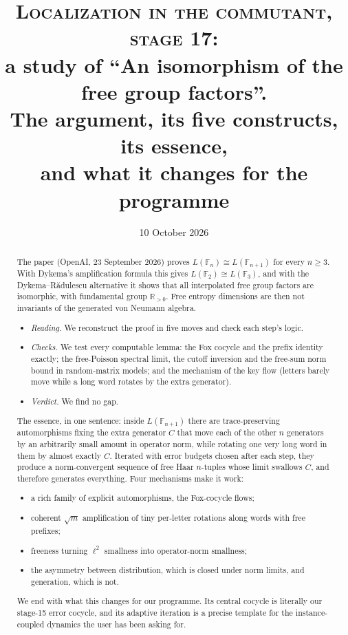\documentclass[11pt]{article}
\title{\textsc{Localization in the commutant, stage 17:}\\ \large a study of ``An isomorphism of the free group factors''.\\
The argument, its five constructs, its essence,\\ and what it changes for the programme}
\author{}
\date{10 October 2026}
\theoremstyle{plain}
\theoremstyle{definition}\newtheorem{definition}[theorem]{Definition}\newtheorem{remark}[theorem]{Remark}
\newcommand{\R}{\mathbb R}\newcommand{\Z}{\mathbb Z}\newcommand{\E}{\mathbb E}\newcommand{\Var}{\operatorname{Var}}\newcommand{\Cov}{\operatorname{Cov}}
\newcommand{\F}{\mathbb F}\newcommand{\Ad}{\operatorname{Ad}}\renewcommand{\arg}{\operatorname{arg}}
\begin{document}
\maketitle
\begin{abstract}
The paper (OpenAI, 23 September 2026) proves $L(\F_n)\cong L(\F_{n+1})$ for every $n\ge3$. With Dykema's amplification formula this gives
$L(\F_2)\cong L(\F_3)$, and with the Dykema--Rădulescu alternative it shows that all interpolated free group factors are isomorphic, with
fundamental group $\R_{>0}$. Free entropy dimensions are then not invariants of the generated von Neumann algebra.
\begin{itemize}[leftmargin=*]
\item \emph{Reading.} We reconstruct the proof in five moves and check each step's logic.
\item \emph{Checks.} We test every computable lemma: the Fox cocycle and the prefix identity exactly; the free-Poisson spectral limit, the
cutoff inversion and the free-sum norm bound in random-matrix models; and the mechanism of the key flow (letters barely move while a long word
rotates by the extra generator).
\item \emph{Verdict.} We find no gap.
\end{itemize}
The essence, in one sentence: inside $L(\F_{n+1})$ there are trace-preserving automorphisms fixing the extra generator $C$ that move each of the
other $n$ generators by an arbitrarily small amount in operator norm, while rotating one very long word in them by almost exactly $C$.
Iterated with error budgets chosen after each step, they produce a norm-convergent sequence of free Haar $n$-tuples whose limit swallows
$C$, and therefore generates everything. Four mechanisms make it work:
\begin{itemize}[leftmargin=*]
\item a rich family of explicit automorphisms, the Fox-cocycle flows;
\item coherent $\sqrt m$ amplification of tiny per-letter rotations along words with free prefixes;
\item freeness turning $\ell^2$ smallness into operator-norm smallness;
\item the asymmetry between distribution, which is closed under norm limits, and generation, which is not.
\end{itemize}
We end with what this changes for our programme. Its central cocycle is literally our stage-15 error cocycle, and its adaptive iteration is a
precise template for the instance-coupled dynamics the user has been asking for.


\end{abstract}
\end{document}
